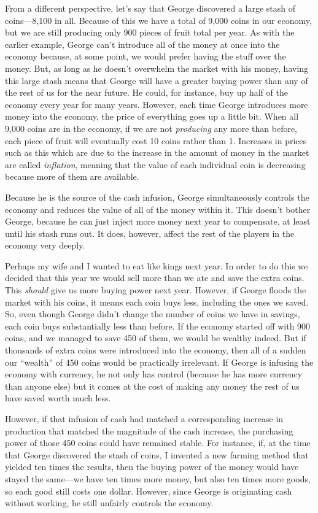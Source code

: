 From a different perspective, let’s say that George discovered
a large stash of
coins---8,100 in all. Because of this we have a total of 9,000 coins in our economy,
but we are still producing only 900 pieces of fruit total per year. As with the earlier
example, George can’t introduce all of the money at once into the
economy because, at some point, we would prefer having the stuff over
the money. But, as long as he doesn't overwhelm the market with his money,
having this large stash means that George will have a
greater buying power than any of the rest of us for the near future. He could, for instance,
buy up half of the economy every year for many years.  However, each time George introduces
more money into the economy, the price of everything goes up a little bit.
When all 9,000 coins are in the economy, if we are not \textit{producing}
any more than before, each piece of fruit will eventually cost 10 coins
rather than 1.  Increases in prices such as this which are due to the increase in the 
amount of money in the market are called \textit{inflation}, meaning that the value
of each individual coin is decreasing because more of them are available.

Because he is the source of the cash infusion, George simultaneously 
controls the economy and reduces the value of all of the money within it.
This doesn't bother George, because he can just inject more money next year to compensate,
at least until his stash runs out.  It does, however, affect the rest of the 
players in the economy very deeply.

Perhaps my wife and I wanted to eat like kings next year.  In order to do this we
decided that this year we would sell more than we ate and save the
extra coins. This \textit{should} give us more buying power next year. However, if
George floods the market with his coins, it means each coin buys less, including
the ones we saved.
So, even though George didn't change the number of coins we have in savings, each coin
buys substantially less than before. If the economy started off with 900 coins, and
we managed to save 450 of them, we would be wealthy indeed. But if
thousands of extra coins were introduced into the economy, then all of a
sudden our ``wealth'' of 450 coins would be practically irrelevant. If
George is infusing the economy with currency, he not only has control
(because he has more currency than anyone else) but it comes at the
cost of making any money the rest of us have saved worth much less. 

However, if that infusion of cash had matched a corresponding increase
in production that matched the magnitude of the cash increase, the
purchasing power of those 450 coins could have remained stable.  
For instance, if, at the time that George discovered the stash of coins,
I invented a new farming method that yielded ten times the results, then
the buying power of the money would have stayed the same---we have ten times
more money, but also ten times more goods, so each good still costs one dollar.  
However, since George is originating cash without working, he still unfairly
controls the economy.

